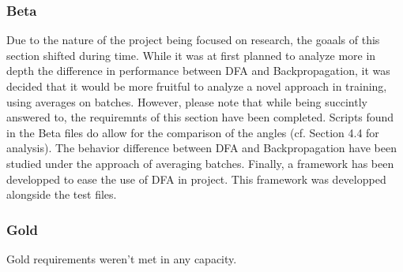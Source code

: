 \documentclass[english]{article}
\begin{document}
\subsubsection{Beta}
Due to the nature of the project being focused on research, the goaals of this section shifted during time.
While it was at first planned to analyze more in depth the difference in performance between DFA and Backpropagation, it was decided that it would be more fruitful to analyze a novel approach in training, using averages on batches.
However, please note that while being succintly answered to, the requiremnts of this section have been completed. Scripts found in the Beta files do allow for the comparison of the angles (cf. Section 4.4 for analysis). The behavior difference between DFA and Backpropagation have been studied under the approach of averaging batches. Finally, a framework has been developped to ease the use of DFA in project. This framework was developped alongside the test files.

\subsubsection{Gold}
Gold requirements weren't met in any capacity.















%  
% 
\end{document}
